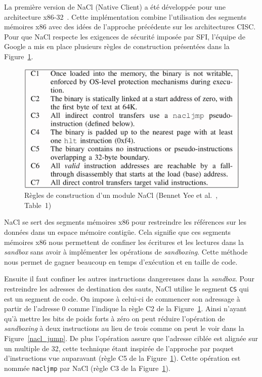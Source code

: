 \documentclass[11pt]{sdm}
\begin{document}
La première version de NaCl (Native Client) a été développée pour une architecture x86-32~\cite{Yee:2010:NCS:1629175.1629203}. Cette implémentation combine l'utilisation des segments mémoires x86 avec des idées de l'approche précédente sur les architectures CISC. Pour que NaCl respecte les exigences de sécurité imposée par SFI, l'équipe de Google a mis en place plusieurs règles de construction présentées dans la Figure~\ref{nacl_constraints}.

\begin{figure}
\centering
\includegraphics[scale=0.25]{images/nacl_constraints.png}
\caption{Règles de construction d'un module NaCl (Bennet Yee et al.~\cite{Yee:2010:NCS:1629175.1629203}, Table~1)}
\label{nacl_constraints}
\end{figure}

NaCl se sert des segments mémoires x86 pour restreindre les références sur les données dans un espace mémoire contig\"ue. Cela signifie que ces segments mémoires x86 nous permettent de confiner les écritures et les lectures dans la \textit{sandbox} sans avoir à implémenter les opérations de \textit{sandboxing}. Cette méthode nous permet de gagner beaucoup en temps d'exécution et en taille de code.

Ensuite il faut confiner les autres instructions dangereuses dans la \textit{sandbox}. Pour restreindre les adresses de destination des sauts, NaCl utilise le segment \texttt{CS} qui est un segment de code. On impose à celui-ci de commencer son adressage à partir de l'adresse 0 comme l'indique la règle C2 de la Figure~\ref{nacl_constraints}. Ainsi n'ayant qu'à mettre les bits de poids forts à zéro on peut réduire l'opération de \textit{sandboxing} à deux instructions au lieu de trois comme on peut le voir dans la Figure~\ref{nacl_jump}. De plus l'opération assure que l'adresse ciblée est alignée sur un multiple de 32, cette technique étant inspirée de l'approche par paquet d'instructions vue auparavant (règle C5 de la Figure~\ref{nacl_constraints}). Cette opération est nommée \texttt{nacljmp} par NaCl (règle C3 de la Figure~\ref{nacl_constraints}).
\end{document}
